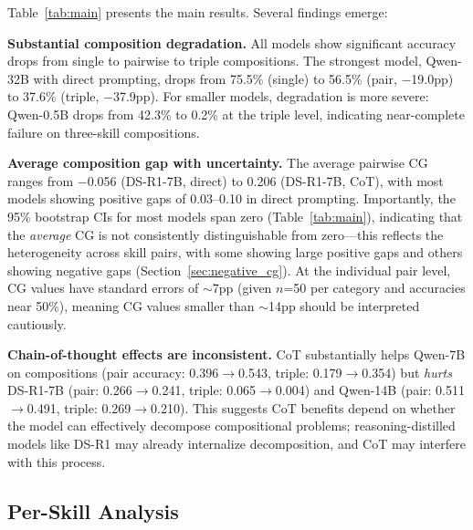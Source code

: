 \documentclass{article}
\begin{document}
Table~\ref{tab:main} presents the main results. Several findings emerge:

\textbf{Substantial composition degradation.} All models show significant accuracy drops from single to pairwise to triple compositions. The strongest model, Qwen-32B with direct prompting, drops from 75.5\% (single) to 56.5\% (pair, $-$19.0pp) to 37.6\% (triple, $-$37.9pp). For smaller models, degradation is more severe: Qwen-0.5B drops from 42.3\% to 0.2\% at the triple level, indicating near-complete failure on three-skill compositions.

\textbf{Average composition gap with uncertainty.} The average pairwise CG ranges from $-$0.056 (DS-R1-7B, direct) to 0.206 (DS-R1-7B, CoT), with most models showing positive gaps of 0.03--0.10 in direct prompting. Importantly, the 95\% bootstrap CIs for most models span zero (Table~\ref{tab:main}), indicating that the \emph{average} CG is not consistently distinguishable from zero---this reflects the heterogeneity across skill pairs, with some showing large positive gaps and others showing negative gaps (Section~\ref{sec:negative_cg}). At the individual pair level, CG values have standard errors of $\sim$7pp (given $n$=50 per category and accuracies near 50\%), meaning CG values smaller than $\sim$14pp should be interpreted cautiously.

\textbf{Chain-of-thought effects are inconsistent.} CoT substantially helps Qwen-7B on compositions (pair accuracy: 0.396$\rightarrow$0.543, triple: 0.179$\rightarrow$0.354) but \emph{hurts} DS-R1-7B (pair: 0.266$\rightarrow$0.241, triple: 0.065$\rightarrow$0.004) and Qwen-14B (pair: 0.511$\rightarrow$0.491, triple: 0.269$\rightarrow$0.210). This suggests CoT benefits depend on whether the model can effectively decompose compositional problems; reasoning-distilled models like DS-R1 may already internalize decomposition, and CoT may interfere with this process.

\subsection{Per-Skill Analysis}
\end{document}

